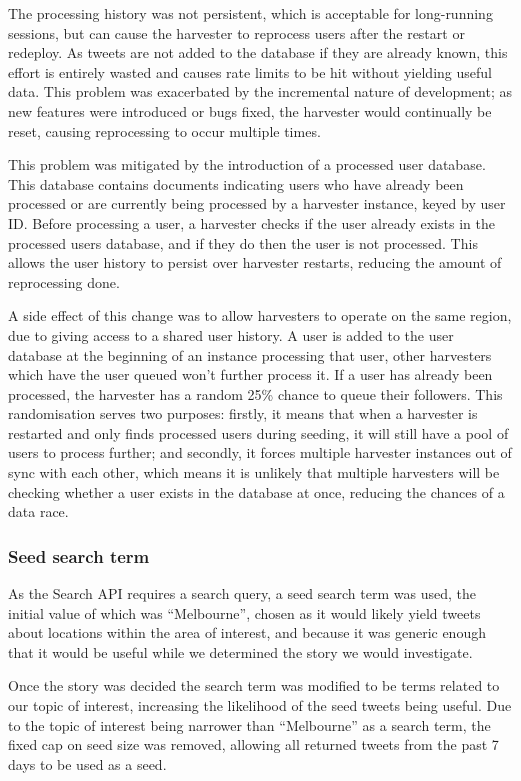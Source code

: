 The processing history was not persistent, which is acceptable for long-running sessions, but can cause the harvester to reprocess users after the restart or redeploy. As tweets are not added to the database if they are already known, this effort is entirely wasted and causes rate limits to be hit without yielding useful data. This problem was exacerbated by the incremental nature of development; as new features were introduced or bugs fixed, the harvester would continually be reset, causing reprocessing to occur multiple times.

This problem was mitigated by the introduction of a processed user database. This database contains documents indicating users who have already been processed or are currently being processed by a harvester instance, keyed by user ID. Before processing a user, a harvester checks if the user already exists in the processed users database, and if they do then the user is not processed. This allows the user history to persist over harvester restarts, reducing the amount of reprocessing done.

A side effect of this change was to allow harvesters to operate on the same region, due to giving access to a shared user history. A user is added to the user database at the beginning of an instance processing that user, other harvesters which have the user queued won't further process it. If a user has already been processed, the harvester has a random 25\% chance to queue their followers. This randomisation serves two purposes: firstly, it means that when a harvester is restarted and only finds processed users during seeding, it will still have a pool of users to process further; and secondly, it forces multiple harvester instances out of sync with each other, which means it is unlikely that multiple harvesters will be checking whether a user exists in the database at once, reducing the chances of a data race.

\subsubsection{Seed search term}

As the Search API requires a search query, a seed search term was used, the initial value of which was ``Melbourne'', chosen as it would likely yield tweets about locations within the area of interest, and because it was generic enough that it would be useful while we determined the story we would investigate.

Once the story was decided the search term was modified to be terms related to our topic of interest, increasing the likelihood of the seed tweets being useful. Due to the topic of interest being narrower than ``Melbourne'' as a search term, the fixed cap on seed size was removed, allowing all returned tweets from the past 7 days to be used as a seed.

